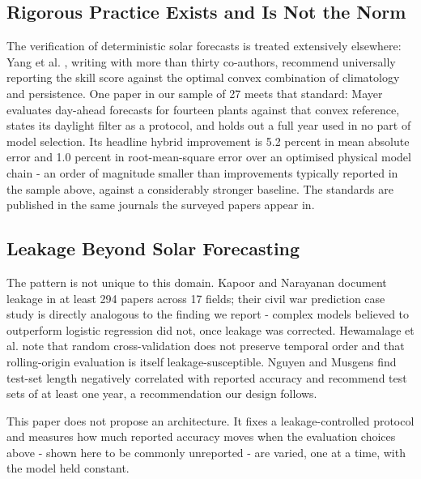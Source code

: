 \subsection{Rigorous Practice Exists and Is Not the Norm}
\label{sec:related-rigorous-practice}

The verification of deterministic solar forecasts is treated
extensively elsewhere: Yang et al. \cite{yang2020verification},
writing with more than thirty co-authors, recommend universally
reporting the skill score against the optimal convex combination of
climatology and persistence. One paper in our sample of 27 meets that
standard: Mayer \cite{mayer2022physmlhybrid} evaluates day-ahead
forecasts for fourteen plants against that convex reference, states its
daylight filter as a protocol, and holds out a full year used in no
part of model selection. Its headline hybrid improvement is 5.2 percent
in mean absolute error and 1.0 percent in root-mean-square error over
an optimised physical model chain - an order of magnitude smaller than
improvements typically reported in the sample above, against a
considerably stronger baseline. The standards are published in the same
journals the surveyed papers appear in.

\subsection{Leakage Beyond Solar Forecasting}
\label{sec:related-leakage}

The pattern is not unique to this domain. Kapoor and Narayanan
\cite{kapoor2023leakage} document leakage in at least 294 papers across
17 fields; their civil war prediction case study is directly analogous
to the finding we report - complex models believed to outperform
logistic regression did not, once leakage was corrected. Hewamalage et
al. \cite{hewamalage2023pitfalls} note that random cross-validation
does not preserve temporal order and that rolling-origin evaluation is
itself leakage-susceptible. Nguyen and Musgens
\cite{nguyenmusgens2021drives} find test-set length negatively
correlated with reported accuracy and recommend test sets of at least
one year, a recommendation our design follows.

This paper does not propose an architecture. It fixes a
leakage-controlled protocol and measures how much reported accuracy
moves when the evaluation choices above - shown here to be commonly
unreported - are varied, one at a time, with the model held constant.
